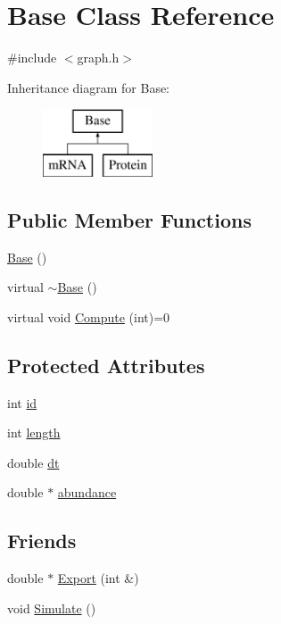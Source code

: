 \hypertarget{class_base}{\section{Base Class Reference}
\label{class_base}
}


{\ttfamily \#include $<$graph.\-h$>$}

Inheritance diagram for Base\-:\begin{figure}[H]
\begin{center}
\leavevmode
\includegraphics[height=2.000000cm]{class_base}
\end{center}
\end{figure}
\subsection*{Public Member Functions}
\begin{DoxyCompactItemize}
\item 
\hyperlink{class_base_a5ffe0568374d8b9b4c4ec32953fd6453}{Base} ()
\item 
virtual \hyperlink{class_base_a722da881b6c70cfcbde9243abcfbf334}{$\sim$\-Base} ()
\item 
virtual void \hyperlink{class_base_a2539be60a003bf1153a87444870cfc50}{Compute} (int)=0
\end{DoxyCompactItemize}
\subsection*{Protected Attributes}
\begin{DoxyCompactItemize}
\item 
int \hyperlink{class_base_af46b05bd03228ba15d40a05c15abffa0}{id}
\item 
int \hyperlink{class_base_afc939d650ee448e4b9e9302fdd8e6dae}{length}
\item 
double \hyperlink{class_base_a4c2c4261e4f2d0e7ebaf93bde00d3a26}{dt}
\item 
double $\ast$ \hyperlink{class_base_a262c09f4273320c819d77ec15a895980}{abundance}
\end{DoxyCompactItemize}
\subsection*{Friends}
\begin{DoxyCompactItemize}
\item 
double $\ast$ \hyperlink{class_base_a50c933a62458087717ab7406e4cf01bc}{Export} (int \&)
\item 
void \hyperlink{class_base_a868cf38fedb3c52291069b74bb198bf0}{Simulate} ()
\end{DoxyCompactItemize}


